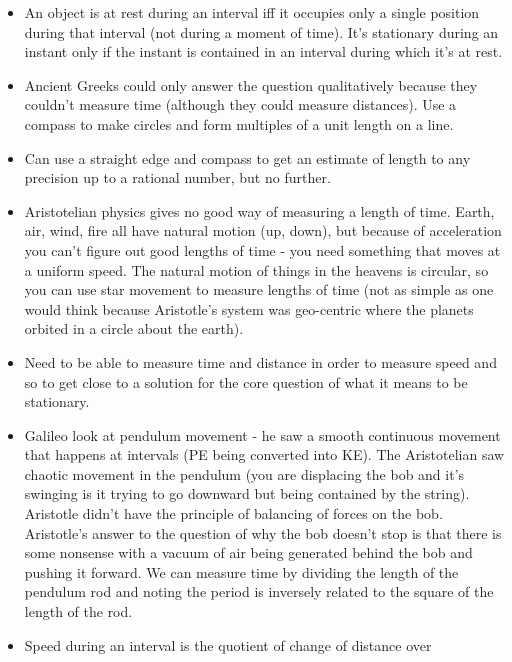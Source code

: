 \documentclass[12pt]{article}
\theoremstyle{definition}
\begin{document}
\begin{itemize}
    \itemsep0em 
    \item  An object is at rest during an interval iff it occupies only a
        single position during that interval (not during a moment of time).
        It's stationary during an instant only if the instant is contained in
        an interval during which it's at rest. 
    \item Ancient Greeks could only answer the question qualitatively because
        they couldn't measure time (although they could measure distances). Use
        a compass to make circles and form multiples of a unit length on a
        line.
    \item Can use a straight edge and compass to get an estimate of length to
        any precision up to a rational number, but no further.
    \item Aristotelian physics gives no good way of measuring a length of time.
        Earth, air, wind, fire all have natural motion (up, down), but because
        of acceleration you can't figure out good lengths of time - you need
        something that moves at a uniform speed. The natural motion of things
        in the heavens is circular, so you can use star movement to measure
        lengths of time (not as simple as one would think because Aristotle's
        system was geo-centric where the planets orbited in a circle about the
        earth).
    \item
        Need to be able to measure time and distance in order to measure speed
        and so to get close to a solution for the core question of what it
        means to be stationary.
    \item
        Galileo look at pendulum movement - he saw a smooth continuous movement
        that happens at intervals (PE being converted into KE). The
        Aristotelian saw chaotic movement in the pendulum (you are displacing
        the bob and it's swinging is it trying to go downward but being
        contained by the string). Aristotle didn't have the principle of
        balancing of forces on the bob. Aristotle's answer to the question of
        why the bob doesn't stop is that there is some nonsense with a vacuum
        of air being generated behind the bob and pushing it forward. We can
        measure time by dividing the length of the pendulum rod and noting the
        period is inversely related to the square of the length of the rod.
    \item
        Speed during an interval is the quotient of change of distance over

\end{itemize}
\end{document}
